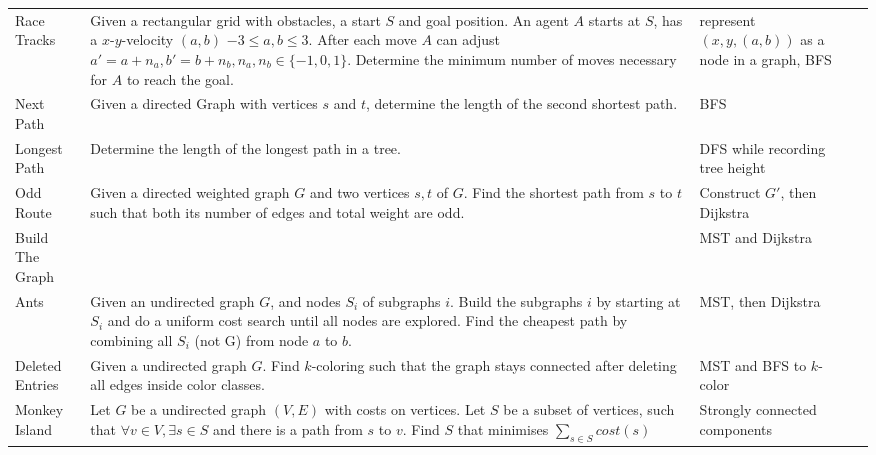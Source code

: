 \documentclass[a4paper, 10pt]{article}
\begin{document}
\begin{longtable}{ L{2cm} L{8cm} L{4cm} r}
        Race Tracks 
        & Given a rectangular grid with obstacles, a start $S$ and goal position. An agent $A$ starts at $S$, has a $x$-$y$-velocity $(a,b)$ 
            $-3\leq a,b \leq3$. After each move $A$ can adjust $a'=a+n_a, b'=b+n_b, n_a,n_b \in \{-1,0,1\}$. 
            Determine the minimum number of moves necessary for $A$ to reach the goal. 
        & represent $(x,y,(a,b))$ as a node in a graph, BFS &  \pageref{sec:race_tracks} \\

        Next Path 
        & Given a directed Graph with vertices $s$ and $t$, determine the length of the second shortest path.
        & BFS &  \pageref{sec:next_path} \\


        Longest Path 
        & Determine the length of the longest path in a tree.
        & DFS while recording tree height &  \pageref{sec:longest_path} \\

        Odd Route
        & Given a directed weighted graph $G$ and two vertices $s,t$ of $G$. Find the shortest path from 
            $s$ to $t$ such that both its number of edges and total weight are odd.
        & Construct $G'$, then Dijkstra &  \pageref{sec:odd_route} \\

        Build The Graph 
        &          
        & MST and Dijkstra &  \pageref{sec:build_the_graph} \\

        Ants 
        & Given an undirected graph $G$, and nodes $S_i$ of subgraphs $i$. 
            Build the subgraphs $i$ by starting at $S_i$ and do a uniform cost search until all nodes are explored.
            Find the cheapest path by combining all $S_i$ (not G) from node $a$ to $b$. 
        & MST, then Dijkstra &  \pageref{sec:ants} \\

        Deleted Entries 
        & Given a undirected graph $G$. Find $k$-coloring such that the graph stays connected after deleting all edges inside color classes. 
        & MST and BFS to $k$-color &  \pageref{sec:deleted_entries} \\

        Monkey Island 
        & Let $G$ be a undirected graph $(V,E)$ with costs on vertices. Let $S$ be a subset of vertices,
            such that $\forall v\in V,\exists s\in S$ and there is a path from  $s$ to $v$. 
            Find $S$ that minimises $\sum_{s\in S}cost(s)$ 
        & Strongly connected components &  \pageref{sec:monkey_island} \\


\end{longtable}
\end{document}
